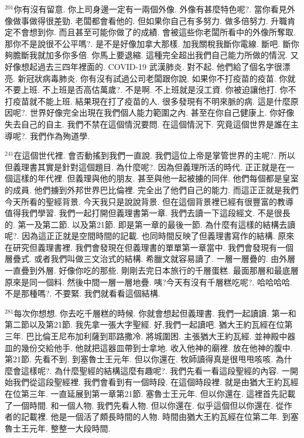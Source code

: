 \documentclass{book}
\begin{document}
$^{201}$你有沒有留意.
你上司身邊一定有一兩個外像.
外像有甚麼特色呢?.
當你看見外像做事做得很差勁.
老闆都會看他的.
但如果你自己有多努力.
做多倍努力.
升職肯定不會想到你.
而且甚至可能你做了的成績.
會被這些你老闆所看中的外像所奪取.
那你不是說很不公平嗎?.
是不是好像加拿大那樣.
加我關稅我斷你電線.
斷吧.
斷你夠膽斷我就加多你多倍.
你馬上要退縮.
這種完全超出我們自己能力所做的情況.
又好像想起過去三四年裡面的.
COVID-19 武漢肺炎.
對不起.
他們給了個名字很漂亮.
新冠狀病毒肺炎.
你有沒有試過公司老闆跟你說.
如果你不打疫苗的疫苗.
你就不要上班.
不上班是否高估萬歲?.
不是啊.
不上班就是沒工資.
你被迫讓他打.
你不打疫苗就不能上班.
結果現在打了疫苗的人.
很多發現有不明來脈的病.
這是什麼原因呢?.
世界好像完全出現在我們個人能力範圍之內.
甚至在你自己健康上.
你好像失去自己的自主.
我們不禁在這個情況要問.
在這個情況下.
究竟這個世界是誰在主導呢?.
我們作為殉道學.

$^{241}$在這個世代裡.
會否動搖到我們一直說.
我們這位上帝是掌管世界的主呢?.
所以但義理書其實是針對這個題目.
為什麼呢?.
因為但義理所活的時代.
正正就是在一個這樣的年代裡.
但義理與他的朋友.
甚至與他一起被擄的同伴.
他們每個都是皇室的成員.
他們擄到外邦世界巴比倫裡.
完全出了他們自己的能力.
而這正正就是我們今天所看的聖經背景.
今天我只是說說背景.
但在這個背景裡已經有很豐富的教導值得我們學習.
我們一起打開但義理書第一章.
我們去讀一下這段經文.
不是很長的.
第一及第二節.
以及第21節.
即是第一章的最後一節.
為什麼有這樣的結構去讀呢?.
因為這正正就是空間時間的記載.
也同時間反映了但義理書寫作的結構.
原來在研究但義理書裡.
我們會發現在但義理書的單單第一章當中.
我們會發現有一個層疊式.
或者我們叫做三文治式的結構.
希臘文就容易讀了.
一層一層疊的.
由外層一直疊到外層.
好像你吃的那些.
剛剛去完日本旅行的千層蛋糕.
最面那層和最底層原來是同一個料.
然後中間一層一層地疊.
咦?今天有沒有千層糕吃呢?.
哈哈哈哈.
不是那種嗎?.
不要緊.
我們就看看這個結構.

$^{281}$每次你想想.
你去吃千層糕的時候.
你就會想起但義理書.
我們一起讀讀.
第一和第二節以及第21節.
我先拿一張大字聖經.
好,我們一起讀吧.
猶大王約瓦經在位第三年.
巴比倫王尼布加利薩到耶路撒冷.
將城圍困.
主張猶大王約瓦經.
並神殿中器皿的幾份交給他手.
他就把這器皿帶到士拿地.
收入他神的廟裡.
放在他神的腹中.
第21節.
先看不到.
到塞魯士王元年.
但以你還在.
牧師讀得真是很甩甩咳咳.
為什麼會這樣呢?.
為什麼聖經的結構這麼有趣呢?.
我們先看一看這段聖經的內容.
一開始我們從這段聖經裡.
我們會看到有一個時段.
在這個時段裡.
就是由猶大王約瓦經在位第三年.
一直延展到第一章第21節.
塞魯士王元年.
但以你還在.
這裡首先記載了一個時間.
和一個人物.
我們先看人物.
但以你還在.
似乎這個但以你還在.
從作者的記載裡.
他是一個活了頗長時間的人物.
時間由猶大王約瓦經在位第二年.
到塞魯士王元年.
整整一大段時間.
\end{document}
